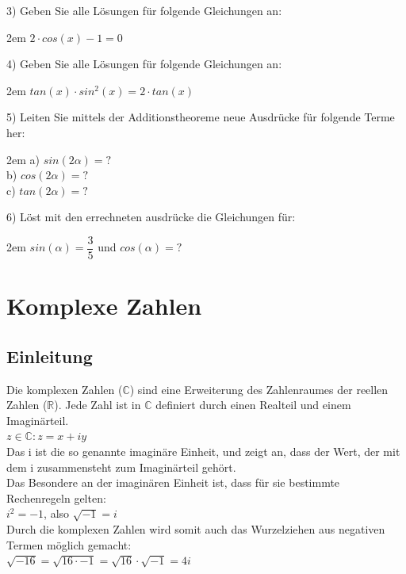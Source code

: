 \documentclass[11pt,final]{scrreprt}
\newcommand{\R} {\mathbb R}
\newcommand{\C} {\mathbb C}
\begin{document}
3) Geben Sie alle Lösungen für folgende Gleichungen an:

\begingroup
\leftskip2em 
$ 2\cdot cos(x) -1 = 0 $\\
\par	
\endgroup 

4) Geben Sie alle Lösungen für folgende Gleichungen an:

\begingroup
\leftskip2em 
$ tan(x)\cdot sin^2(x) = 2\cdot tan(x) $\\
\par	
\endgroup 

5) Leiten Sie mittels der Additionstheoreme neue Ausdrücke für folgende Terme her:

\begingroup
\leftskip2em 
a) $sin(2\alpha) = ?$\\
b) $cos(2\alpha) = ?$\\
c) $tan(2\alpha) = ?$\\
\par	
\endgroup 

6) Löst mit den errechneten ausdrücke die Gleichungen für:

\begingroup
\leftskip2em 
$sin(\alpha) = \dfrac{3}{5} $ und $cos(\alpha) = ?$\\
\par	
\endgroup 

\chapter{Komplexe Zahlen}

\section{Einleitung}

Die komplexen Zahlen ($\C$) sind eine Erweiterung des Zahlenraumes der reellen Zahlen ($\R$). Jede Zahl ist in $\C$ definiert durch einen Realteil und einem Imaginärteil.\\
$ z \in \C \colon z = x + iy$\\
Das i ist die so genannte imaginäre Einheit, und zeigt an, dass der Wert, der mit dem i zusammensteht zum Imaginärteil gehört.\\
Das Besondere an der imaginären Einheit ist, dass für sie bestimmte Rechenregeln gelten:\\
$ i^2 = -1 $, also $ \sqrt{-1} = i$\\
Durch die komplexen Zahlen wird somit auch das Wurzelziehen aus negativen Termen möglich gemacht:\\
$ \sqrt{-16} = \sqrt{16 \cdot -1} = \sqrt{16} \cdot \sqrt{-1} = 4i $\\
\end{document}
